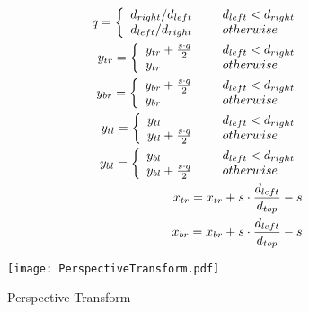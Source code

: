 \begin{align}
 q = \left\{ 
	 \begin{array}{ll}
	 {d_{right}}/{d_{left}} &\mbox{\hspace{0.5cm}} d_{left}<d_{right}\\
	 {d_{left}}/{d_{right}} &\mbox{\hspace{0.5cm}} otherwise
	 \end{array} 
\right.\label{eq:points_q}\\
y_{tr}=\left\{ 
	 \begin{array}{ll}
	 {y_{tr} + \frac{s\cdot q}{2}} &\mbox{\hspace{0.5cm}} d_{left}<d_{right}\\
	 {y_{tr}} &\mbox{\hspace{0.5cm}} otherwise
	 \end{array}\right.\label{eq:points_tr_y}\\
y_{br}=\left\{ 
	 \begin{array}{ll}
	 {y_{br} + \frac{s\cdot q}{2}} &\mbox{\hspace{0.5cm}} d_{left}<d_{right}\\
	 {y_{br}} &\mbox{\hspace{0.5cm}} otherwise
	 \end{array}\right.\label{eq:points_br_y}\\
y_{tl}=\left\{ 
	 \begin{array}{ll}
	 {y_{tl}} &\mbox{\hspace{0.5cm}} d_{left}<d_{right}\\
	 {y_{tl} + \frac{s\cdot q}{2}} &\mbox{\hspace{0.5cm}} otherwise
	 \end{array}\right.\label{eq:points_tl_y}\\
y_{bl}=\left\{ 
	 \begin{array}{ll}
	 {y_{bl}} &\mbox{\hspace{0.5cm}} d_{left}<d_{right}\\
	 {y_{bl} + \frac{s\cdot q}{2}} &\mbox{\hspace{0.5cm}} otherwise
	 \end{array}\right.\label{eq:points_bl_y}\\
 x_{tr} = x_{tr} + s \cdot \frac{d_{left}}{d_{top}} - s\label{eq:points_tr_x}\\
 x_{br} = x_{br} + s \cdot \frac{d_{left}}{d_{top}} - s\label{eq:points_br_x}
\end{align}  

\begin{figure}[H]
\begin{center}
  \texttt{[image: PerspectiveTransform.pdf]}
  \caption[]{Perspective Transform}
  \label{figure:perspective}
\end{center}
\end{figure}

